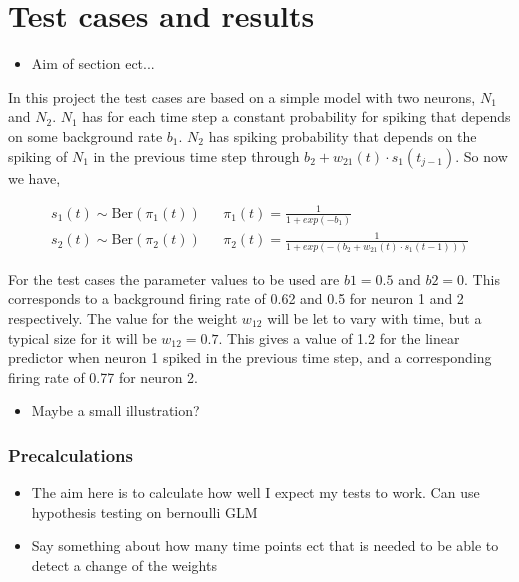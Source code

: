 
\chapter{Test cases and results}

\begin{itemize}
    \item Aim of section ect...
\end{itemize}

In this project the test cases are based on a simple model with two neurons, $N_1$ and $N_2$. $N_1$ has for each time step a constant probability for spiking that depends on some background rate $b_1$. $N_2$ has spiking probability that depends on the spiking of $N_1$ in the previous time step through $b_2 + w_{21}(t) \cdot s_1(t_{j-1})$. So now we have,

\begin{align*}
    s_1(t) \sim \text{Ber}(\pi_1(t)) && \pi_1(t)= \frac{1}{1+exp(-b_1)} \\
    s_2(t) \sim \text{Ber}(\pi_2(t)) && \pi_2(t)= \frac{1}{1+exp(-(b_2 + w_{21}(t) \cdot s_1(t-1)))}
\end{align*}

For the test cases the parameter values to be used are $b1 = 0.5$ and $b2 = 0$. This corresponds to a background firing rate of 0.62 and 0.5 for neuron 1 and 2 respectively. The value for the weight $w_{12}$ will be let to vary with time, but a typical size for it will be $w_{12}=0.7$. This gives a value of 1.2 for the linear predictor when neuron 1 spiked in the previous time step, and a corresponding firing rate of 0.77 for neuron 2.

\begin{itemize}
    \item Maybe a small illustration?
\end{itemize}

\subsection{Precalculations}

\begin{itemize}
    \item The aim here is to calculate how well I expect my tests to work. Can use hypothesis testing on bernoulli GLM 
    \item Say something about how many time points ect that is needed to be able to detect a change of the weights
\end{itemize}

